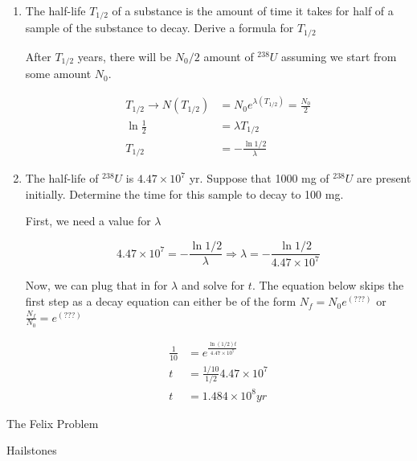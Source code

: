 \documentclass[11pt,answers]{exam}
\begin{document}
\begin{questions}
\begin{enumerate}
\pagebreak
\item The half-life $T_{1/2}$ of a substance is the amount of time it takes for half of a sample of the substance to decay. Derive a formula for $T_{1/2}$
\begin{solution}

After $T_{1/2}$ years, there will be $N_0 / 2$ amount of $^{238}U$ assuming we start from some amount $N_0$.

\begin{align*}
T_{1/2} \rightarrow N(T_{1/2}) &= N_0e^{\lambda(T_{1/2})} = \frac{N_0}{2}\\
\ln{\frac{1}{2}} &= \lambda T_{1/2} \\
T_{1/2} &= - \frac{\ln{1/2}}{\lambda}
\end{align*}

\end{solution}


\item The half-life of $^{238} U$ is $4.47 \times 10^7$ yr. Suppose that 1000 mg of $^{238} U$ are present initially.  Determine the time for this sample to decay to 100 mg.
\begin{solution}

First, we need a value for $\lambda$

\[
4.47 \times 10^7 = - \frac{\ln{1/2}}{\lambda} \Rightarrow \lambda = -\frac{\ln{1/2}}{4.47 \times 10^7}
\]

Now, we can plug that in for $\lambda$ and solve for $t$.  The equation below skips the first step as a decay equation can either be of the form $N_f = N_0 e^{(???)}$ or $\frac{N_f}{N_0} = e^{(???)}$

\begin{align*}
\frac{1}{10} &= e^{\frac{\ln{(1/2)}t}{4.47\times 10^7}}\\
t &= \frac{1/10}{1/2}4.47\times 10^7 \\
t &= 1.484 \times 10^8 yr
\end{align*}
\end{solution}
\end{enumerate}

\question The Felix Problem
\begin{solution}

\end{solution}

\question Hailstones
\begin{solution}


\end{solution}
\end{questions}
\end{document}
